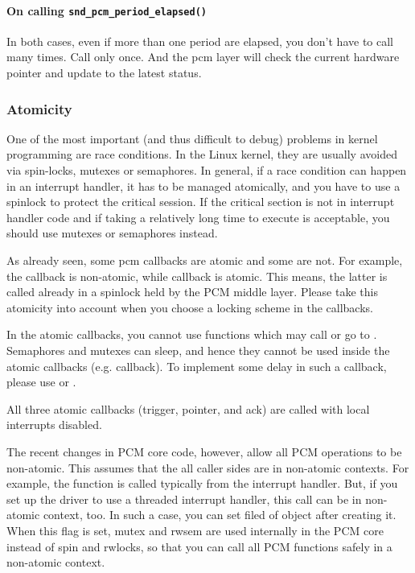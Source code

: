 \documentclass[a4paper,8pt,english]{sphinxmanual}
\begin{document}
\paragraph{On calling \texttt{snd\_pcm\_period\_elapsed()}}
\label{sound/kernel-api/writing-an-alsa-driver:on-calling-snd-pcm-period-elapsed}
In both cases, even if more than one period are elapsed, you don't have
to call  many times. Call only
once. And the pcm layer will check the current hardware pointer and
update to the latest status.


\subsubsection{Atomicity}
\label{sound/kernel-api/writing-an-alsa-driver:atomicity}
One of the most important (and thus difficult to debug) problems in
kernel programming are race conditions. In the Linux kernel, they are
usually avoided via spin-locks, mutexes or semaphores. In general, if a
race condition can happen in an interrupt handler, it has to be managed
atomically, and you have to use a spinlock to protect the critical
session. If the critical section is not in interrupt handler code and if
taking a relatively long time to execute is acceptable, you should use
mutexes or semaphores instead.

As already seen, some pcm callbacks are atomic and some are not. For
example, the  callback is non-atomic, while 
callback is atomic. This means, the latter is called already in a
spinlock held by the PCM middle layer. Please take this atomicity into
account when you choose a locking scheme in the callbacks.

In the atomic callbacks, you cannot use functions which may call
 or go to . Semaphores and
mutexes can sleep, and hence they cannot be used inside the atomic
callbacks (e.g.  callback). To implement some delay in such a
callback, please use  or .

All three atomic callbacks (trigger, pointer, and ack) are called with
local interrupts disabled.

The recent changes in PCM core code, however, allow all PCM operations
to be non-atomic. This assumes that the all caller sides are in
non-atomic contexts. For example, the function
 is called typically from the
interrupt handler. But, if you set up the driver to use a threaded
interrupt handler, this call can be in non-atomic context, too. In such
a case, you can set  filed of  object after creating it. When this flag is set, mutex
and rwsem are used internally in the PCM core instead of spin and
rwlocks, so that you can call all PCM functions safely in a non-atomic
context.
\end{document}
